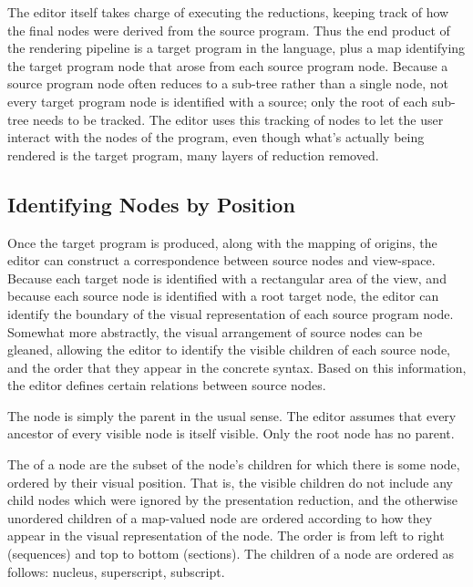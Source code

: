 The editor itself takes charge of executing the reductions, keeping track of how the final  nodes were derived from the source program. Thus the end product of the rendering pipeline is a target program in the  language, plus a map identifying the target program node that arose from each source program node. Because a source program node often reduces to a sub-tree rather than a single node, not every target program node is identified with a source; only the root of each sub-tree needs to be tracked. The editor uses this tracking of nodes to let the user interact with the nodes of the  program, even though what's actually being rendered is the target program, many layers of reduction removed.


\subsection{Identifying Nodes by Position}
Once the target program is produced, along with the mapping of origins, the editor can construct a correspondence between source nodes and view-space. Because each target node is identified with a rectangular area of the view, and because each source node is identified with a root target node, the editor can identify the boundary of the visual representation of each source program node. Somewhat more abstractly, the visual arrangement of source nodes can be gleaned, allowing the editor to identify the visible children of each source node, and the order that they appear in the concrete syntax. Based on this information, the editor defines certain relations between source nodes.

The  node is simply the parent in the usual sense. The editor assumes that every ancestor of every visible node is itself visible. Only the root node has no parent.

The  of a node are the subset of the node's children for which there is some  node, ordered by their visual position. That is, the visible children do not include any child nodes which were ignored by the presentation reduction, and the otherwise unordered children of a map-valued node are ordered according to how they appear in the visual representation of the node. The order is from left to right (sequences) and top to bottom (sections). The children of a  node are ordered as follows: nucleus, superscript, subscript.

